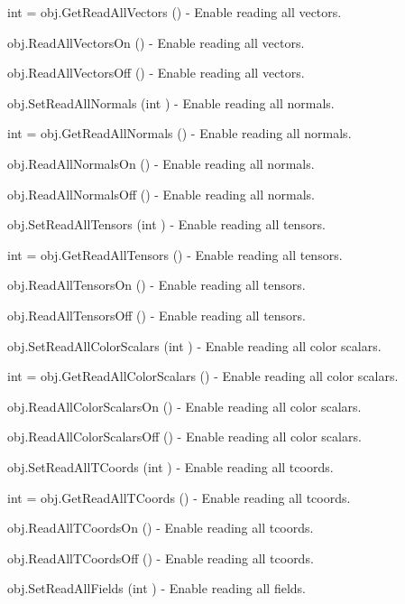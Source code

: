 \begin{DoxyItemize}
\item {\ttfamily int = obj.\-Get\-Read\-All\-Vectors ()} -\/ Enable reading all vectors.  
\item {\ttfamily obj.\-Read\-All\-Vectors\-On ()} -\/ Enable reading all vectors.  
\item {\ttfamily obj.\-Read\-All\-Vectors\-Off ()} -\/ Enable reading all vectors.  
\item {\ttfamily obj.\-Set\-Read\-All\-Normals (int )} -\/ Enable reading all normals.  
\item {\ttfamily int = obj.\-Get\-Read\-All\-Normals ()} -\/ Enable reading all normals.  
\item {\ttfamily obj.\-Read\-All\-Normals\-On ()} -\/ Enable reading all normals.  
\item {\ttfamily obj.\-Read\-All\-Normals\-Off ()} -\/ Enable reading all normals.  
\item {\ttfamily obj.\-Set\-Read\-All\-Tensors (int )} -\/ Enable reading all tensors.  
\item {\ttfamily int = obj.\-Get\-Read\-All\-Tensors ()} -\/ Enable reading all tensors.  
\item {\ttfamily obj.\-Read\-All\-Tensors\-On ()} -\/ Enable reading all tensors.  
\item {\ttfamily obj.\-Read\-All\-Tensors\-Off ()} -\/ Enable reading all tensors.  
\item {\ttfamily obj.\-Set\-Read\-All\-Color\-Scalars (int )} -\/ Enable reading all color scalars.  
\item {\ttfamily int = obj.\-Get\-Read\-All\-Color\-Scalars ()} -\/ Enable reading all color scalars.  
\item {\ttfamily obj.\-Read\-All\-Color\-Scalars\-On ()} -\/ Enable reading all color scalars.  
\item {\ttfamily obj.\-Read\-All\-Color\-Scalars\-Off ()} -\/ Enable reading all color scalars.  
\item {\ttfamily obj.\-Set\-Read\-All\-T\-Coords (int )} -\/ Enable reading all tcoords.  
\item {\ttfamily int = obj.\-Get\-Read\-All\-T\-Coords ()} -\/ Enable reading all tcoords.  
\item {\ttfamily obj.\-Read\-All\-T\-Coords\-On ()} -\/ Enable reading all tcoords.  
\item {\ttfamily obj.\-Read\-All\-T\-Coords\-Off ()} -\/ Enable reading all tcoords.  
\item {\ttfamily obj.\-Set\-Read\-All\-Fields (int )} -\/ Enable reading all fields.  

\end{DoxyItemize}
